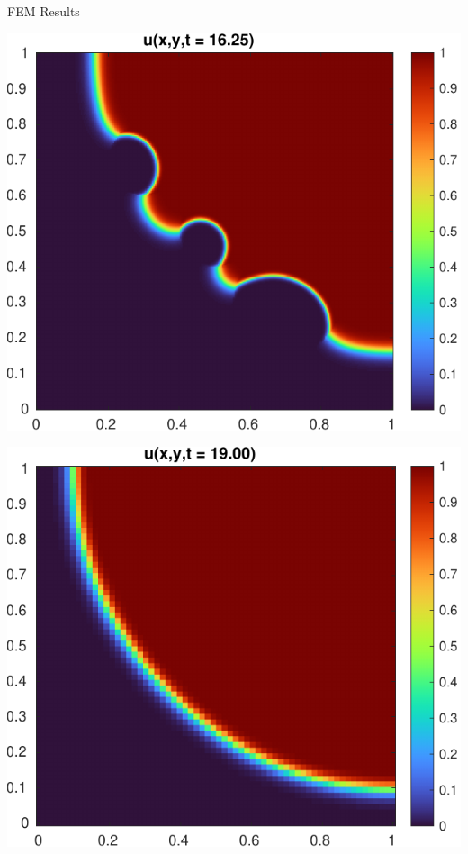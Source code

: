 \documentclass[14pt,aspectratio=169]{beamer}
\begin{document}
\begin{frame}[plain]
	\centering
	FEM Results
\end{frame}

\begin{frame}
	\centering
	\includegraphics[height=\textheight]{figs/S01.pdf}
\end{frame}

\begin{frame}
	\centering
	\includegraphics[height=\textheight]{figs/S1.pdf}
\end{frame}
\end{document}
